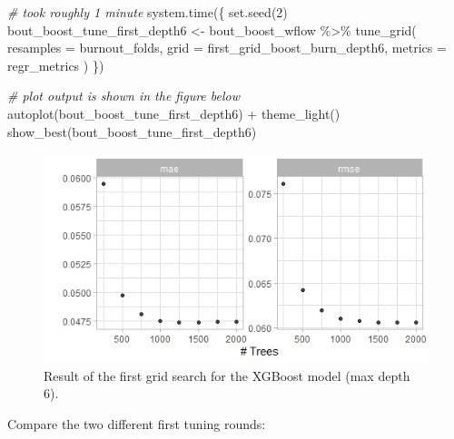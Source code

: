 \documentclass[
]{book}
\newenvironment{Shaded}{\begin{snugshade}}{\end{snugshade}}
\newcommand{\AttributeTok}[1]{\textcolor[rgb]{0.77,0.63,0.00}{#1}}
\newcommand{\CommentTok}[1]{\textcolor[rgb]{0.56,0.35,0.01}{\textit{#1}}}
\newcommand{\DecValTok}[1]{\textcolor[rgb]{0.00,0.00,0.81}{#1}}
\newcommand{\FunctionTok}[1]{\textcolor[rgb]{0.00,0.00,0.00}{#1}}
\newcommand{\NormalTok}[1]{#1}
\newcommand{\OtherTok}[1]{\textcolor[rgb]{0.56,0.35,0.01}{#1}}
\newcommand{\SpecialCharTok}[1]{\textcolor[rgb]{0.00,0.00,0.00}{#1}}
\begin{document}
\begin{Shaded}
\begin{Highlighting}[]
\CommentTok{\# took roughly 1 minute}
\FunctionTok{system.time}\NormalTok{(\{}
  \FunctionTok{set.seed}\NormalTok{(}\DecValTok{2}\NormalTok{)}
\NormalTok{  bout\_boost\_tune\_first\_depth6 }\OtherTok{\textless{}{-}}\NormalTok{ bout\_boost\_wflow }\SpecialCharTok{\%\textgreater{}\%}
    \FunctionTok{tune\_grid}\NormalTok{(}
      \AttributeTok{resamples =}\NormalTok{  burnout\_folds,}
      \AttributeTok{grid =}\NormalTok{ first\_grid\_boost\_burn\_depth6,}
      \AttributeTok{metrics =}\NormalTok{ regr\_metrics}
\NormalTok{    )}
\NormalTok{\})}

\CommentTok{\# plot output is shown in the figure below}
\FunctionTok{autoplot}\NormalTok{(bout\_boost\_tune\_first\_depth6) }\SpecialCharTok{+} \FunctionTok{theme\_light}\NormalTok{()}
\FunctionTok{show\_best}\NormalTok{(bout\_boost\_tune\_first\_depth6)}
\end{Highlighting}
\end{Shaded}

\begin{figure}

{\centering \includegraphics[width=0.7\linewidth]{_pictures/burn_boost_tune_first} 

}

\caption{Result of the first grid search for the XGBoost model (max depth 6).}\label{fig:boostburntuneplot1}
\end{figure}

Compare the two different first tuning rounds:
\end{document}
